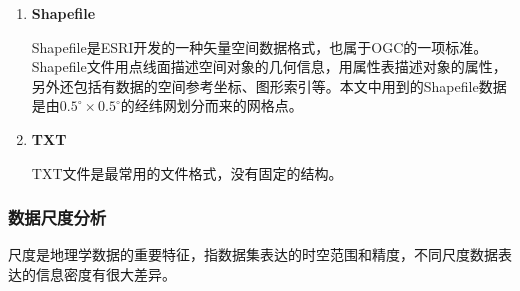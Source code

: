 \begin{enumerate}[(1)]
    \item \textbf{Shapefile}
    
    Shapefile是ESRI开发的一种矢量空间数据格式，也属于OGC的一项标准。Shapefile文件用点线面描述空间对象的几何信息，用属性表描述对象的属性，另外还包括有数据的空间参考坐标、图形索引等。本文中用到的Shapefile数据是由$0.5^{\circ} \times 0.5^{\circ}$的经纬网划分而来的网格点。

    \item \textbf{TXT}
    
    TXT文件是最常用的文件格式，没有固定的结构。

\end{enumerate}

\subsubsection{数据尺度分析}
尺度是地理学数据的重要特征，指数据集表达的时空范围和精度，不同尺度数据表达的信息密度有很大差异。
